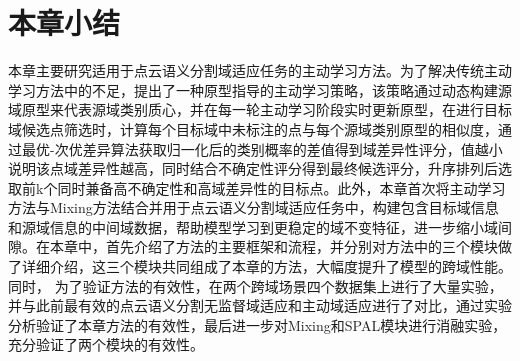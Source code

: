 \section{本章小结}
本章主要研究适用于点云语义分割域适应任务的主动学习方法。为了解决传统主动学习方法中的不足，提出了一种原型指导的主动学习策略，该策略通过动态构建源域原型来代表源域类别质心，并在每一轮主动学习阶段实时更新原型，在进行目标域候选点筛选时，计算每个目标域中未标注的点与每个源域类别原型的相似度，通过最优-次优差异算法获取归一化后的类别概率的差值得到域差异性评分，值越小说明该点域差异性越高，同时结合不确定性评分得到最终候选评分，升序排列后选取前k个同时兼备高不确定性和高域差异性的目标点。此外，本章首次将主动学习方法与Mixing方法结合并用于点云语义分割域适应任务中，构建包含目标域信息和源域信息的中间域数据，帮助模型学习到更稳定的域不变特征，进一步缩小域间隙。在本章中，首先介绍了方法的主要框架和流程，并分别对方法中的三个模块做了详细介绍，这三个模块共同组成了本章的方法，大幅度提升了模型的跨域性能。同时， 为了验证方法的有效性，在两个跨域场景四个数据集上进行了大量实验，并与此前最有效的点云语义分割无监督域适应和主动域适应进行了对比，通过实验分析验证了本章方法的有效性，最后进一步对Mixing和SPAL模块进行消融实验，充分验证了两个模块的有效性。

